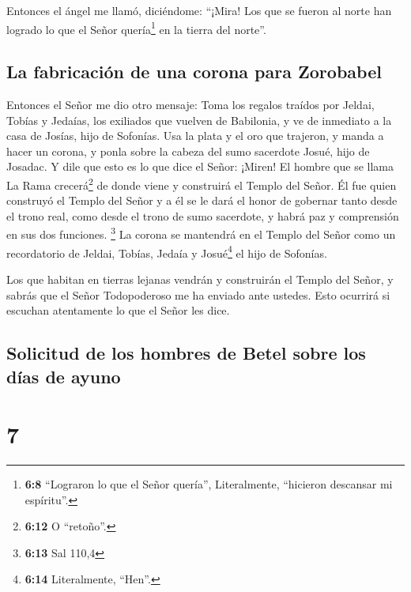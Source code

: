  Entonces el ángel me llamó, diciéndome: ``¡Mira! Los que
se fueron al norte han logrado lo que el Señor quería\footnote{\textbf{6:8}
  ``Lograron lo que el Señor quería'', Literalmente, ``hicieron
  descansar mi espíritu''.} en la tierra del norte''.

\hypertarget{la-fabricaciuxf3n-de-una-corona-para-zorobabel}{%
\subsection{La fabricación de una corona para
Zorobabel}\label{la-fabricaciuxf3n-de-una-corona-para-zorobabel}}

 Entonces el Señor me dio otro mensaje: 
Toma los regalos traídos por Jeldai, Tobías y Jedaías, los exiliados que
vuelven de Babilonia, y ve de inmediato a la casa de Josías, hijo de
Sofonías.  Usa la plata y el oro que trajeron, y manda a
hacer un corona, y ponla sobre la cabeza del sumo sacerdote Josué, hijo
de Josadac.  Y dile que esto es lo que dice el Señor:
¡Miren! El hombre que se llama La Rama crecerá\footnote{\textbf{6:12} O
  ``retoño''.} de donde viene y construirá el Templo del Señor.
 Él fue quien construyó el Templo del Señor y a él se le
dará el honor de gobernar tanto desde el trono real, como desde el trono
de sumo sacerdote, y habrá paz y comprensión en sus dos funciones.
\footnote{\textbf{6:13} Sal 110,4}  La corona se
mantendrá en el Templo del Señor como un recordatorio de Jeldai, Tobías,
Jedaía y Josué\footnote{\textbf{6:14} Literalmente, ``Hen''.} el hijo de
Sofonías.

 Los que habitan en tierras lejanas vendrán y construirán
el Templo del Señor, y sabrás que el Señor Todopoderoso me ha enviado
ante ustedes. Esto ocurrirá si escuchan atentamente lo que el Señor les
dice.

\hypertarget{solicitud-de-los-hombres-de-betel-sobre-los-duxedas-de-ayuno}{%
\subsection{Solicitud de los hombres de Betel sobre los días de
ayuno}\label{solicitud-de-los-hombres-de-betel-sobre-los-duxedas-de-ayuno}}

\hypertarget{section-6}{%
\section{7}\label{section-6}}

